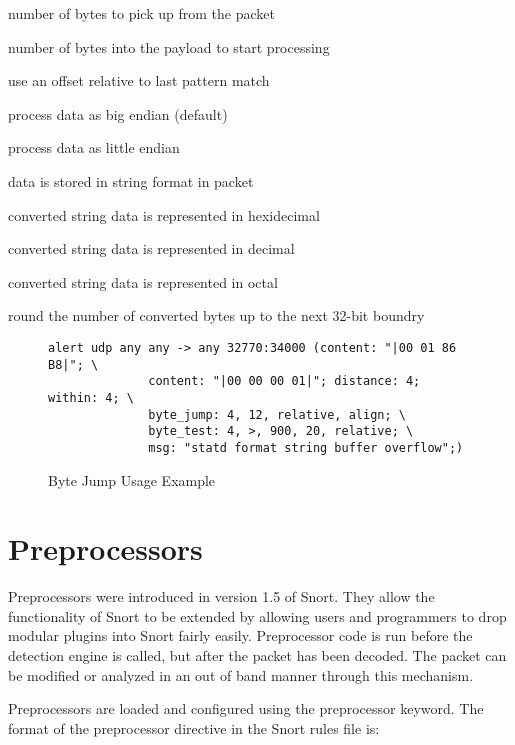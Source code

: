 \documentclass[english]{report}
\begin{document}
\begin{description}{}
\item [bytes\_to\_convert]number of bytes to pick up from the packet
\item [offset]number of bytes into the payload to start processing
\item [relative]use an offset relative to last pattern match
\item [big]process data as big endian (default)
\item [little]process data as little endian
\item [string]data is stored in string format in packet
\item [hex]converted string data is represented in hexidecimal
\item [dec]converted string data is represented in decimal
\item [oct]converted string data is represented in octal
\item [align]round the number of converted bytes up to the next 32-bit boundry
\end{description}

\begin{figure}[!hbpt]
\begin{verbatim}
alert udp any any -> any 32770:34000 (content: "|00 01 86 B8|"; \
              content: "|00 00 00 01|"; distance: 4; within: 4; \
              byte_jump: 4, 12, relative, align; \
              byte_test: 4, >, 900, 20, relative; \
              msg: "statd format string buffer overflow";)
\end{verbatim}
\caption{Byte Jump Usage Example \label{fig:Byte_Jump}}
\end{figure}






\section{Preprocessors}

Preprocessors were introduced in version 1.5 of Snort. They allow
the functionality of Snort to be extended by allowing users and programmers
to drop modular plugins into Snort fairly easily.
Preprocessor code is run before the detection engine is called, but
after the packet has been decoded. The packet can be modified or analyzed
in an out of band manner through this mechanism.

Preprocessors are loaded and configured using the preprocessor keyword.
The format of the preprocessor directive in the Snort rules file is:
\end{document}
